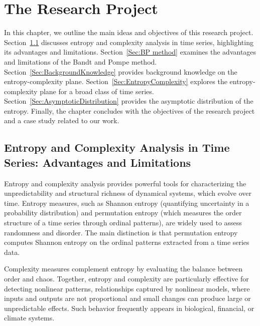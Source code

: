 \chapter{The Research Project}\label{C:aim}

In this chapter, we outline the main ideas and objectives of this research project. 
Section~\ref{Sec:AdvantagesLimitations} discusses entropy and complexity analysis in time series, highlighting its advantages and limitations. 
Section~\ref{Sec:BP method} examines the advantages and  limitations of the Bandt and Pompe method. 
Section~\ref{Sec:BackgroundKnowledge}  provides background knowledge on the 
entropy-complexity plane. 
Section~\ref{Sec:EntropyComplexity} explores the entropy-complexity plane for a broad class of time series. Section~\ref{Sec:AsymptoticDistribution} provides the asymptotic distribution of the entropy. Finally, the chapter concludes with the objectives of the research project and a case study related to our work.

\section{Entropy and Complexity Analysis in Time Series: Advantages and Limitations}\label{Sec:AdvantagesLimitations}

Entropy and complexity analysis provides powerful tools for characterizing the unpredictability and structural richness of dynamical systems, which evolve over time. Entropy measures, such as Shannon entropy (quantifying uncertainty in a probability distribution) and permutation entropy (which measures the order structure of a time series through ordinal patterns), are widely used to assess randomness and disorder. The main distinction is that permutation entropy computes Shannon entropy on the ordinal patterns extracted from a time series data.
 

Complexity measures complement entropy by evaluating the balance between order and chaos. Together, entropy and complexity are particularly effective for detecting nonlinear patterns, relationships captured by nonlinear models, where inputs and outputs are not proportional and small changes can produce large or unpredictable effects. Such behavior frequently appears in biological, financial, or climate systems.


